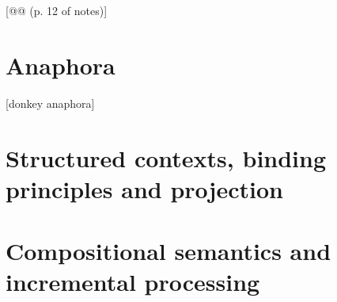 [@@ 
(p. 12 of notes)]


\section{Anaphora}
\label{sec:anaph}

[donkey anaphora]

\section{Structured contexts, binding principles and projection}
\label{sec:struc-cntxt}

\section{Compositional semantics and incremental processing}

